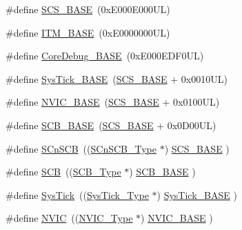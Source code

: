 \begin{DoxyCompactItemize}
\item 
\#define \hyperlink{group___c_m_s_i_s__core__register_ga3c14ed93192c8d9143322bbf77ebf770}{S\-C\-S\-\_\-\-B\-A\-S\-E}~(0x\-E000\-E000\-U\-L)
\item 
\#define \hyperlink{group___c_m_s_i_s__core__register_gadd76251e412a195ec0a8f47227a8359e}{I\-T\-M\-\_\-\-B\-A\-S\-E}~(0x\-E0000000\-U\-L)
\item 
\#define \hyperlink{group___c_m_s_i_s__core__register_ga680604dbcda9e9b31a1639fcffe5230b}{Core\-Debug\-\_\-\-B\-A\-S\-E}~(0x\-E000\-E\-D\-F0\-U\-L)
\item 
\#define \hyperlink{group___c_m_s_i_s__core__register_ga58effaac0b93006b756d33209e814646}{Sys\-Tick\-\_\-\-B\-A\-S\-E}~(\hyperlink{group___c_m_s_i_s__core__register_ga3c14ed93192c8d9143322bbf77ebf770}{S\-C\-S\-\_\-\-B\-A\-S\-E} +  0x0010\-U\-L)
\item 
\#define \hyperlink{group___c_m_s_i_s__core__register_gaa0288691785a5f868238e0468b39523d}{N\-V\-I\-C\-\_\-\-B\-A\-S\-E}~(\hyperlink{group___c_m_s_i_s__core__register_ga3c14ed93192c8d9143322bbf77ebf770}{S\-C\-S\-\_\-\-B\-A\-S\-E} +  0x0100\-U\-L)
\item 
\#define \hyperlink{group___c_m_s_i_s__core__register_gad55a7ddb8d4b2398b0c1cfec76c0d9fd}{S\-C\-B\-\_\-\-B\-A\-S\-E}~(\hyperlink{group___c_m_s_i_s__core__register_ga3c14ed93192c8d9143322bbf77ebf770}{S\-C\-S\-\_\-\-B\-A\-S\-E} +  0x0\-D00\-U\-L)
\item 
\#define \hyperlink{group___c_m_s_i_s__core__register_ga9fe0cd2eef83a8adad94490d9ecca63f}{S\-Cn\-S\-C\-B}~((\hyperlink{struct_s_cn_s_c_b___type}{S\-Cn\-S\-C\-B\-\_\-\-Type}    $\ast$)     \hyperlink{group___c_m_s_i_s__core__register_ga3c14ed93192c8d9143322bbf77ebf770}{S\-C\-S\-\_\-\-B\-A\-S\-E}      )
\item 
\#define \hyperlink{group___c_m_s_i_s__core__register_gaaaf6477c2bde2f00f99e3c2fd1060b01}{S\-C\-B}~((\hyperlink{struct_s_c_b___type}{S\-C\-B\-\_\-\-Type}       $\ast$)     \hyperlink{group___c_m_s_i_s__core__register_gad55a7ddb8d4b2398b0c1cfec76c0d9fd}{S\-C\-B\-\_\-\-B\-A\-S\-E}      )
\item 
\#define \hyperlink{group___c_m_s_i_s__core__register_gacd96c53beeaff8f603fcda425eb295de}{Sys\-Tick}~((\hyperlink{struct_sys_tick___type}{Sys\-Tick\-\_\-\-Type}   $\ast$)     \hyperlink{group___c_m_s_i_s__core__register_ga58effaac0b93006b756d33209e814646}{Sys\-Tick\-\_\-\-B\-A\-S\-E}  )
\item 
\#define \hyperlink{group___c_m_s_i_s__core__register_gac8e97e8ce56ae9f57da1363a937f8a17}{N\-V\-I\-C}~((\hyperlink{struct_n_v_i_c___type}{N\-V\-I\-C\-\_\-\-Type}      $\ast$)     \hyperlink{group___c_m_s_i_s__core__register_gaa0288691785a5f868238e0468b39523d}{N\-V\-I\-C\-\_\-\-B\-A\-S\-E}     )

\end{DoxyCompactItemize}
